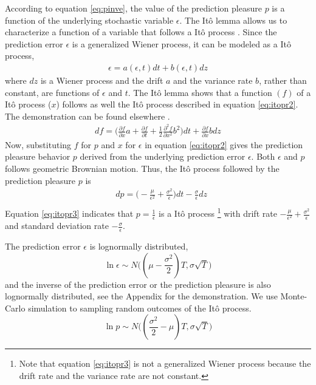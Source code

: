 \documentclass[11pt, onecolumn]{article}
\begin{document}
According to equation \ref{eq:pinve}, the value of the prediction pleasure $p$ is a function of the underlying stochastic variable $\epsilon$. The It\^{o} lemma allows us to characterize a function of a variable that follows a It\^{o} process \citep{ito_stochastic_1951}. Since the prediction error $\epsilon$ is a generalized Wiener process, it can be modeled as a It\^{o} process, 
\begin{equation*}
\begin{split}
   \epsilon = a(\epsilon,t)dt + b(\epsilon,t)dz
\end{split}
\label{eq:itopr}
\end{equation*}
where $dz$ is a Wiener process and the drift $a$ and the variance rate $b$, rather than constant, are functions of $\epsilon$ and $t$. The It\^{o} lemma shows that a function $(f)$ of a It\^{o} process ($x$) follows as well the It\^{o} process described in equation \ref{eq:itopr2}. The demonstration can be found elsewhere \citep{shreve_stochastic_2010}. 
\begin{equation}
\begin{split}
   df = \bigg(\frac{\partial f}{\partial x} a  + \frac{\partial f}{\partial t} + \frac{1}{2}\frac{\partial ^2 f}{\partial x^2} b^2 \bigg)dt + \frac{\partial f}{\partial x}b dz
\end{split}
\label{eq:itopr2}
\end{equation}
Now, substituting $f$ for $p$ and $x$ for $\epsilon$ in equation \ref{eq:itopr2} gives the prediction pleasure behavior $p$ derived from the underlying prediction error $\epsilon$. Both $\epsilon$ and $p$ follows geometric Brownian motion.
Thus, the It\^{o} process followed by the prediction pleasure $p$ is 
\begin{equation}
\begin{split}
 & dp =  \big(- \frac{\mu}{\epsilon^2} + \frac{\sigma^2}{\epsilon}\big)dt - \frac{\sigma}{\epsilon}dz \\
\end{split}
\label{eq:itopr3}
\end{equation}
Equation \ref{eq:itopr3} indicates that $p = \frac{1}{\epsilon}$ is a It\^{o} process \footnote{Note that equation \ref{eq:itopr3} is not a generalized Wiener process because the drift rate and the variance rate are not constant.} with drift rate $-\frac{\mu}{\epsilon^2} + \frac{\sigma^2}{\epsilon}$ and standard deviation rate $-\frac{\sigma}{\epsilon}$.

The prediction error $\epsilon$ is lognormally distributed, 
\begin{equation*}
\ln \epsilon \sim N \bigg((\mu -\frac{\sigma^2}{2})T, \sigma \sqrt{T}\bigg)
\end{equation*}
and the inverse of the prediction error or the prediction pleasure is also lognormally distributed, see the Appendix for the demonstration. We use Monte-Carlo simulation to sampling random outcomes of the It\^{o} process.
\begin{equation*}
\ln p \sim N\bigg( (\frac{\sigma^2}{2} - \mu)T, \sigma \sqrt{T} \bigg)
\end{equation*}
\end{document}
